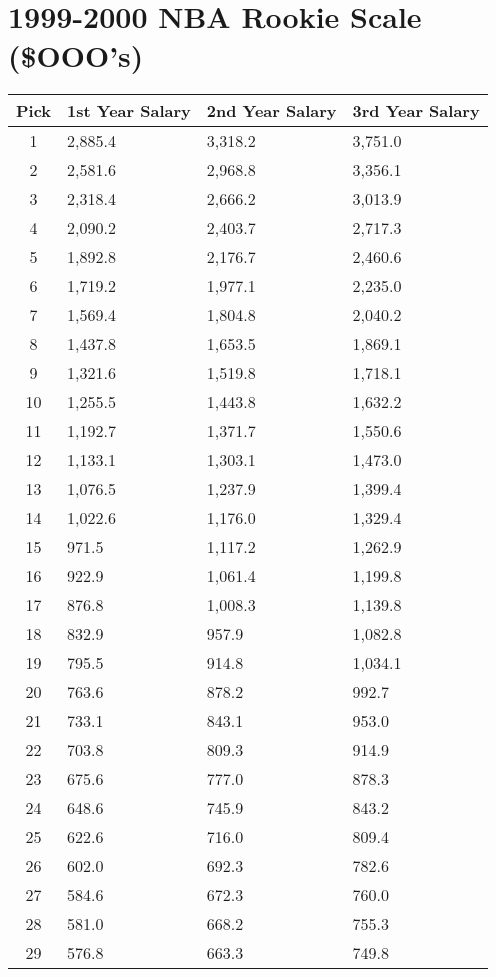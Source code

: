 \documentclass[
]{book}
\begin{document}
\newpage

\hypertarget{nba-rookie-scale-ooos-1}{%
\section{1999-2000 NBA Rookie Scale (\$OOO's)}\label{nba-rookie-scale-ooos-1}}

\begin{longtable}[]{@{}clll@{}}
\toprule()
Pick & 1st Year Salary & 2nd Year Salary & 3rd Year Salary \\
\midrule()
\endhead
1 & 2,885.4 & 3,318.2 & 3,751.0 \\
2 & 2,581.6 & 2,968.8 & 3,356.1 \\
3 & 2,318.4 & 2,666.2 & 3,013.9 \\
4 & 2,090.2 & 2,403.7 & 2,717.3 \\
5 & 1,892.8 & 2,176.7 & 2,460.6 \\
6 & 1,719.2 & 1,977.1 & 2,235.0 \\
7 & 1,569.4 & 1,804.8 & 2,040.2 \\
8 & 1,437.8 & 1,653.5 & 1,869.1 \\
9 & 1,321.6 & 1,519.8 & 1,718.1 \\
10 & 1,255.5 & 1,443.8 & 1,632.2 \\
11 & 1,192.7 & 1,371.7 & 1,550.6 \\
12 & 1,133.1 & 1,303.1 & 1,473.0 \\
13 & 1,076.5 & 1,237.9 & 1,399.4 \\
14 & 1,022.6 & 1,176.0 & 1,329.4 \\
15 & 971.5 & 1,117.2 & 1,262.9 \\
16 & 922.9 & 1,061.4 & 1,199.8 \\
17 & 876.8 & 1,008.3 & 1,139.8 \\
18 & 832.9 & 957.9 & 1,082.8 \\
19 & 795.5 & 914.8 & 1,034.1 \\
20 & 763.6 & 878.2 & 992.7 \\
21 & 733.1 & 843.1 & 953.0 \\
22 & 703.8 & 809.3 & 914.9 \\
23 & 675.6 & 777.0 & 878.3 \\
24 & 648.6 & 745.9 & 843.2 \\
25 & 622.6 & 716.0 & 809.4 \\
26 & 602.0 & 692.3 & 782.6 \\
27 & 584.6 & 672.3 & 760.0 \\
28 & 581.0 & 668.2 & 755.3 \\
29 & 576.8 & 663.3 & 749.8 \\
\bottomrule()
\end{longtable}
\end{document}
